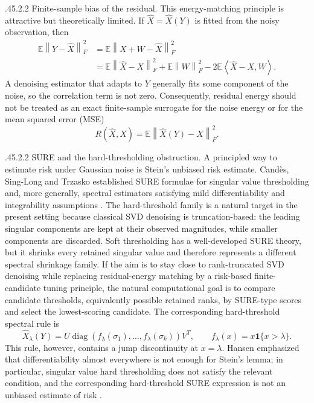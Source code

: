 \documentclass[12pt,reqno]{amsart}
\makeatletter
\numberwithin{equation}{section}
\def\paragraph{\@startsection{paragraph}{4}{\z@}%
  {.45\linespacing\@plus.2\linespacing}{.2\linespacing}%
  {\normalfont\bfseries}}
\theoremstyle{plain}
\theoremstyle{definition}
\newcommand{\diagop}{\operatorname{diag}}
\newcommand{\E}{\mathbb{E}}
\newcommand{\ind}{\mathbf{1}}
\newcommand{\norm}[1]{\left\lVert #1\right\rVert}
\newcommand{\inner}[2]{\left\langle #1,#2\right\rangle}
\makeatother
\begin{document}
\paragraph{Finite-sample bias of the residual.}
This energy-matching principle is attractive but theoretically limited. If $\widehat X=\widehat X(Y)$ is fitted from the noisy observation, then
\begin{equation}
\begin{aligned}
    \E\norm{Y-\widehat X}_{F}^{2}
    &=\E\norm{X+W-\widehat X}_{F}^{2} \\
    &=\E\norm{\widehat X-X}_{F}^{2}+\E\norm{W}_{F}^{2}-2\E\inner{\widehat X-X}{W}.
\end{aligned}
\end{equation}
A denoising estimator that adapts to $Y$ generally fits some component of the noise, so the correlation term is not zero. Consequently, residual energy should not be treated as an exact finite-sample surrogate for the noise energy or for the mean squared error (MSE)
\begin{equation}
    R(\widehat X,X)=\E\norm{\widehat X(Y)-X}_{F}^{2}.
\end{equation}

\paragraph{SURE and the hard-thresholding obstruction.}
A principled way to estimate risk under Gaussian noise is Stein's unbiased risk estimate. Cand\`es, Sing-Long and Trzasko established SURE formulae for singular value thresholding and, more generally, spectral estimators satisfying mild differentiability and integrability assumptions \cite{candes2013unbiased}. The hard-threshold family is a natural target in the present setting because classical SVD denoising is truncation-based: the leading singular components are kept at their observed magnitudes, while smaller components are discarded. Soft thresholding has a well-developed SURE theory, but it shrinks every retained singular value and therefore represents a different spectral shrinkage family. If the aim is to stay close to rank-truncated SVD denoising while replacing residual-energy matching by a risk-based finite-candidate tuning principle, the natural computational goal is to compare candidate thresholds, equivalently possible retained ranks, by SURE-type scores and select the lowest-scoring candidate. The corresponding hard-threshold spectral rule is
\begin{equation}
    \widehat X_{\lambda}(Y)
    =U\diagop(f_{\lambda}(\sigma_1),\ldots,f_{\lambda}(\sigma_k))V^{T},
    \qquad
    f_{\lambda}(x)=x\ind\{x>\lambda\}.
\end{equation}
This rule, however, contains a jump discontinuity at $x=\lambda$. Hansen emphasized that differentiability almost everywhere is not enough for Stein's lemma; in particular, singular value hard thresholding does not satisfy the relevant condition, and the corresponding hard-threshold SURE expression is not an unbiased estimate of risk \cite{hansen2017comment}.
\end{document}
